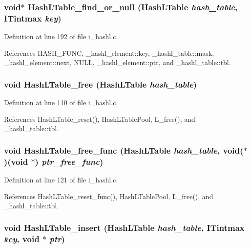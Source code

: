 \subsubsection{\setlength{\rightskip}{0pt plus 5cm}void$\ast$ Hash\-LTable\_\-find\_\-or\_\-null (\bf{Hash\-LTable} {\em hash\_\-table}, \bf{ITintmax} {\em key})}\label{i__hashl_8h_73d4f4d209b3012388d5fc5c21e3cbc9}




Definition at line 192 of file i\_\-hashl.c.

References HASH\_\-FUNC, \_\-hashl\_\-element::key, \_\-hashl\_\-table::mask, \_\-hashl\_\-element::next, NULL, \_\-hashl\_\-element::ptr, and \_\-hashl\_\-table::tbl.
\subsubsection{\setlength{\rightskip}{0pt plus 5cm}void Hash\-LTable\_\-free (\bf{Hash\-LTable} {\em hash\_\-table})}\label{i__hashl_8h_b165d08c368e2dc631242d87b88707f1}




Definition at line 110 of file i\_\-hashl.c.

References Hash\-LTable\_\-reset(), Hash\-LTable\-Pool, L\_\-free(), and \_\-hashl\_\-table::tbl.
\subsubsection{\setlength{\rightskip}{0pt plus 5cm}void Hash\-LTable\_\-free\_\-func (\bf{Hash\-LTable} {\em hash\_\-table}, void($\ast$)(void $\ast$) {\em ptr\_\-free\_\-func})}\label{i__hashl_8h_044024d3dccd7952ebb356bb73f2cd64}




Definition at line 121 of file i\_\-hashl.c.

References Hash\-LTable\_\-reset\_\-func(), Hash\-LTable\-Pool, L\_\-free(), and \_\-hashl\_\-table::tbl.
\subsubsection{\setlength{\rightskip}{0pt plus 5cm}void Hash\-LTable\_\-insert (\bf{Hash\-LTable} {\em hash\_\-table}, \bf{ITintmax} {\em key}, void $\ast$ {\em ptr})}\label{i__hashl_8h_be1a296810d8ee934232c8b2a9e4f413}




